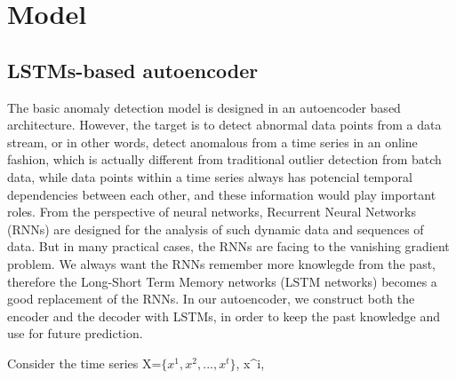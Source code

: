 \chapter{Model}
\label{model}

\section{LSTMs-based autoencoder}
\label{sec:LSTMs-based autoencoder}

The basic anomaly detection model is designed in an autoencoder based architecture. However, the target is to detect abnormal data points from a data stream, or in other words, detect anomalous from a time series in an online fashion, which is actually different from traditional outlier detection from batch data, while data points within a time series always has potencial temporal dependencies between each other, and these information would play important roles. From the perspective of neural networks, Recurrent Neural Networks (RNNs) are designed for the analysis of such dynamic data and sequences of data. But in many practical cases, the RNNs are facing to the vanishing gradient problem. We always want the RNNs remember more knowlegde from the past, therefore the Long-Short Term Memory networks (LSTM networks) becomes a good replacement of the RNNs. In our autoencoder, we construct both the encoder and the decoder with LSTMs, in order to keep the past knowledge and use for future prediction. 

Consider the time series X=$\{x^{1}, x^{2}, ..., x^{t} \}$, x^{i}\in {},  